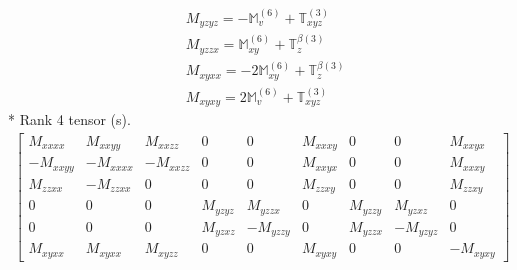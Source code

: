 \documentclass[fleqn,8pt,landscape]{jsarticle}
\begin{document}
\begin{align*}
& M_{yzyz} = - \mathbb{M}_{v}^{(6)} + \mathbb{T}_{xyz}^{(3)} \\
& M_{yzzx} = \mathbb{M}_{xy}^{(6)} + \mathbb{T}_{z}^{\beta(3)} \\
& M_{xyxx} = - 2 \mathbb{M}_{xy}^{(6)} + \mathbb{T}_{z}^{\beta(3)} \\
& M_{xyxy} = 2 \mathbb{M}_{v}^{(6)} + \mathbb{T}_{xyz}^{(3)}
\end{align*}
* Rank 4 tensor (s).
\begin{align*}
\begin{bmatrix} M_{xxxx} & M_{xxyy} & M_{xxzz} & 0 & 0 & M_{xxxy} & 0 & 0 & M_{xxyx} \\ - M_{xxyy} & - M_{xxxx} & - M_{xxzz} & 0 & 0 & M_{xxyx} & 0 & 0 & M_{xxxy} \\ M_{zzxx} & - M_{zzxx} & 0 & 0 & 0 & M_{zzxy} & 0 & 0 & M_{zzxy} \\ 0 & 0 & 0 & M_{yzyz} & M_{yzzx} & 0 & M_{yzzy} & M_{yzxz} & 0 \\ 0 & 0 & 0 & M_{yzxz} & - M_{yzzy} & 0 & M_{yzzx} & - M_{yzyz} & 0 \\ M_{xyxx} & M_{xyxx} & M_{xyzz} & 0 & 0 & M_{xyxy} & 0 & 0 & - M_{xyxy} \end{bmatrix}
\end{align*}
\end{document}
